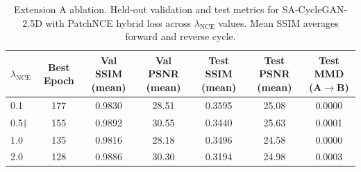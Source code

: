 \begin{table}[t]
\centering
\caption{Extension A ablation. Held-out validation and test metrics for SA-CycleGAN-2.5D with PatchNCE hybrid loss across $\lambda_{\mathrm{NCE}}$ values. Mean SSIM averages forward and reverse cycle.}
\label{tab:patchnce_ablation}
\begin{tabular}{lcccccc}
\toprule
$\lambda_{\mathrm{NCE}}$ & Best Epoch & Val SSIM (mean) & Val PSNR (mean) & Test SSIM (mean) & Test PSNR (mean) & Test MMD (A$\rightarrow$B) \\
\midrule
0.1 & 177 & 0.9830 & 28.51 & 0.3595 & 25.08 & 0.0000 \\
0.5$\dagger$ & 155 & 0.9892 & 30.55 & 0.3440 & 25.63 & 0.0001 \\
1.0 & 135 & 0.9816 & 28.18 & 0.3496 & 24.58 & 0.0000 \\
2.0 & 128 & 0.9886 & 30.30 & 0.3194 & 24.98 & 0.0003 \\
\bottomrule
\end{tabular}
\end{table}
